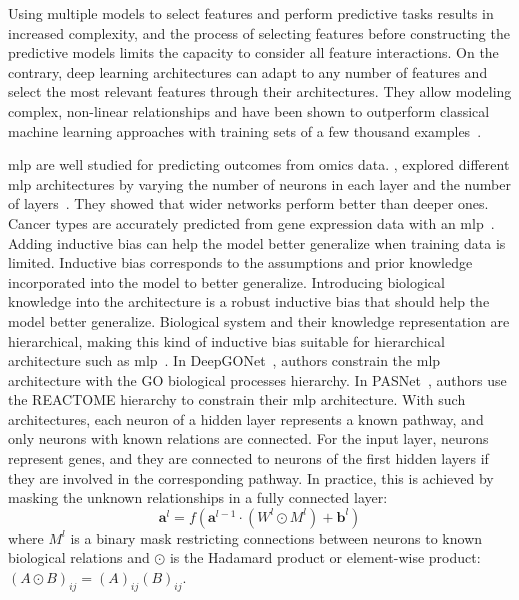 \documentclass[../main.tex]{subfiles}
\begin{document}
	Using multiple models to select features and perform predictive tasks results in increased complexity, and the process of selecting features before constructing the predictive models limits the capacity to consider all feature interactions.
	On the contrary, deep learning architectures can adapt to any number of features and select the most relevant features through their architectures.
	They allow modeling complex, non-linear relationships and have been shown to outperform classical machine learning approaches with training sets of a few thousand examples~\cite{Hanczar2022}.

	\Gls{mlp} are well studied for predicting outcomes from omics data.
	\citeauthor{yuArchitecturesAccuracyArtificial2019b}, explored different \gls{mlp} architectures by varying the number of neurons in each layer and the number of layers~\cite{yuArchitecturesAccuracyArtificial2019b}.
	They showed that wider networks perform better than deeper ones.
	Cancer types are accurately predicted from gene expression data with an \gls{mlp}~\cite{Divate2022}.
	Adding inductive bias can help the model better generalize when training data is limited.
	Inductive bias corresponds to the assumptions and prior knowledge incorporated into the model to better generalize.
	Introducing biological knowledge into the architecture is a robust inductive bias that should help the model better generalize.
	Biological system and their knowledge representation are hierarchical, making this kind of inductive bias suitable for hierarchical architecture such as \gls{mlp}~\cite{bourgeaisDeepGONetSelfexplainable2021,haoPASNetPathwayassociatedSparse2018}.
	In DeepGONet~\cite{bourgeaisDeepGONetSelfexplainable2021}, authors constrain the \gls{mlp} architecture with the GO biological processes hierarchy.
	In PASNet~\cite{haoPASNetPathwayassociatedSparse2018,Hao2018}, authors use the REACTOME hierarchy to constrain their \gls{mlp} architecture.
	With such architectures, each neuron of a hidden layer represents a known pathway, and only neurons with known relations are connected.
	For the input layer, neurons represent genes, and they are connected to neurons of the first hidden layers if they are involved in the corresponding pathway.
	In practice, this is achieved by masking the unknown relationships in a fully connected layer:
	\begin{equation}
		\symbf{a}^{l} = f\left( \symbf{a}^{l-1} \cdot \left( W^l \odot M^l\right) + \symbf{b}^{l} \right) \label{eq:mlp_sparse_matrix}
	\end{equation}
	where \(M^l\) is a binary mask restricting connections between neurons to known biological relations and \(\odot\) is the Hadamard product or element-wise product: \({\left(A\odot B\right)}_{ij} = {\left(A\right)}_{ij}{\left(B\right)}_{ij}\).
\end{document}
